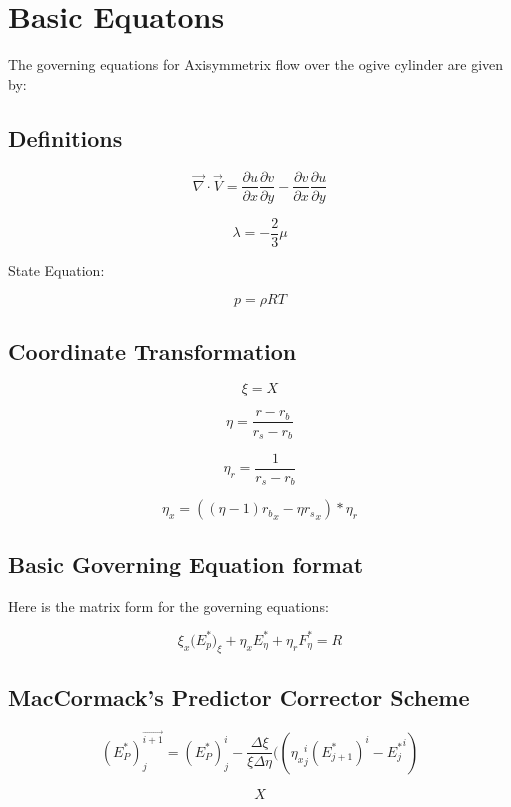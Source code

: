 \documentclass{article}
\begin{document}
\section{Basic Equatons}
The governing equations for Axisymmetrix flow over the ogive cylinder are given by:
\par{}
\subsection{Definitions}
\[
\overrightarrow{\nabla} \cdot \overrightarrow{V} = 
\frac{\partial{u}}{\partial{x}}\frac{\partial{v}}{\partial{y}}-
\frac{\partial{v}}{\partial{x}}\frac{\partial{u}}{\partial{y}}
\]
\par{}
\[
{\lambda} = -{\frac{2}{3}}{\mu}
\]

State Equation:
\par{}
\[
{p} = {\rho}{R}{T}
\]
\par{}

\subsection{Coordinate Transformation}
\[
{\xi} = {X}
\]
\par{}
\[
{\eta} = \frac{{r} - {r_b}}{{r_s} - {r_b}}
\]
\par{}
\[
{\eta_r} = \frac{1}{{r_s} - {r_b}}
\]
\par{}
\[
{\eta_x} = ((\eta - 1){r_b}_x -{\eta}{r_s}_x)*{\eta_r}
\]
\par{}
\subsection{Basic Governing Equation format}

Here is the matrix form for the governing equations:

\[ {\xi_x}({{E^*_p})_\xi} + {\eta_x}{E^*_\eta} + {\eta_r}{F^*_\eta} = {R} \]
\par{}

\subsection{MacCormack's Predictor Corrector Scheme}
\[
({E^*_P})^{\overrightarrow{{i+1}}}_{j} = ({E^*_P})^{i}_{j} -
\frac{\Delta\xi}{\xi\Delta\eta}(
({\eta_x}^i_j({E^*_{j+1}})^i - {E^*_j}^i
)
\]

\[
X
\]
\end{document}
